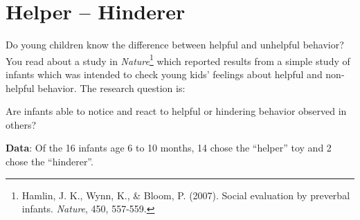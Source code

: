
\def\theTopic{Helper--Hinderer }
\def\dayNum{4}



 \section{ Helper -- Hinderer}


Do young children know the difference between helpful and unhelpful
behavior?  You read about a study in   {\it Nature}\footnote{ Hamlin, J. K.,
  Wynn, K., \& Bloom, P. (2007). Social evaluation by preverbal
  infants. {\it Nature}, 450, 557-559. } which
reported results from a simple study of infants which was intended to
check young kids' feelings about helpful and non-helpful behavior.  
  The research question is:
\begin{center}
  {\sf Are infants able to notice and react to helpful or hindering
    behavior observed in others?} 
\end{center}

{\bf Data}:  Of the 16 infants age 6 to 10 months, 14 chose the ``helper'' toy
and 2 chose the ``hinderer''.

